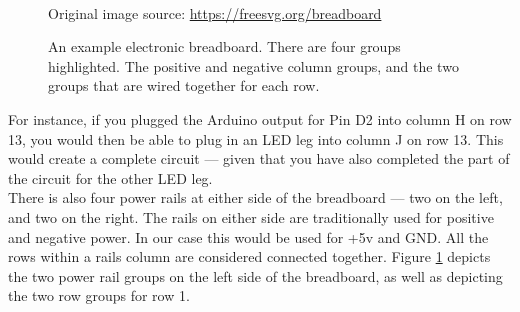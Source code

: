 \documentclass[11pt,a4paper]{article}
\begin{document}
\begin{figure}[ht!]
    \begin{center}
        \\
        \scriptsize
        Original image source: \url{https://freesvg.org/breadboard}
    \end{center}
    \caption{An example electronic breadboard. There are four groups highlighted. The positive and negative column groups, and the two groups that are wired together for each row.}
    \label{fig:breadboard-groups}
\end{figure}

\noindent
For instance, if you plugged the Arduino output for Pin D2 into column H on row 13, you would then be able to plug in an LED leg into column J on row 13. This would create a complete circuit --- given that you have also completed the part of the circuit for the other LED leg.\\

\noindent
There is also four power rails at either side of the breadboard --- two on the left, and two on the right. The rails on either side are traditionally used for positive and negative power. In our case this would be used for +5v and GND. All the rows within a rails column are considered connected together. Figure \ref{fig:breadboard-groups} depicts the two power rail groups on the left side of the breadboard, as well as depicting the two row groups for row 1.
\end{document}
